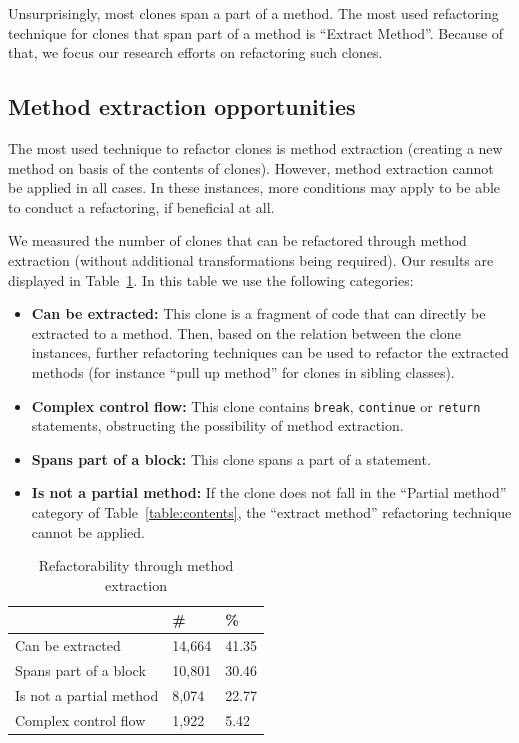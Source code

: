 \documentclass[a4paper]{article}
\begin{document}
Unsurprisingly, most clones span a part of a method. The most used refactoring technique for clones that span part of a method is ``Extract Method''. Because of that, we focus our research efforts on refactoring such clones.

\subsection{Method extraction opportunities}\label{chap:mergingdups}
The most used technique to refactor clones is method extraction (creating a new method on basis of the contents of clones). However, method extraction cannot be applied in all cases. In these instances, more conditions may apply to be able to conduct a refactoring, if beneficial at all.

We measured the number of clones that can be refactored through method extraction (without additional transformations being required). Our results are displayed in Table~\ref{table:refactorability}. In this table we use the following categories:
\begin{itemize}
    \item \textbf{Can be extracted:} This clone is a fragment of code that can directly be extracted to a method. Then, based on the relation between the clone instances, further refactoring techniques can be used to refactor the extracted methods (for instance ``pull up method'' for clones in sibling classes).
    \item \textbf{Complex control flow:} This clone contains \texttt{break}, \texttt{continue} or \texttt{return} statements, obstructing the possibility of method extraction.
    \item \textbf{Spans part of a block:} This clone spans a part of a statement.
    \item \textbf{Is not a partial method:} If the clone does not fall in the ``Partial method'' category of Table~\ref{table:contents}, the ``extract method'' refactoring technique cannot be applied.
\end{itemize}

\begin{table}[H]
  \begin{center}
  \caption{Refactorability through method extraction} \label{table:refactorability}
  \medskip
\begin{tabular}{|l|l|l|}
\hline
\textbf{}         & \textbf{\#} & \textbf{\%} \\ \hline
Can be extracted     & 14,664 & 41.35 \\ \hline
Spans part of a block  & 10,801 & 30.46 \\ \hline
Is not a partial method   & 8,074 & 22.77 \\ \hline
Complex control flow & 1,922 & 5.42 \\ \hline
\end{tabular}
\end{center}
\end{table}
\end{document}
